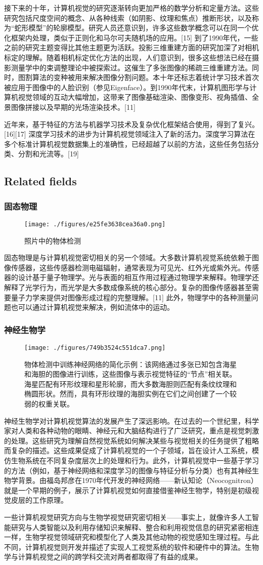 接下来的十年，计算机视觉的研究逐渐转向更加严格的数学分析和定量方法。这些研究包括尺度空间的概念、从各种线索（如阴影、纹理和焦点）推断形状，以及称为“蛇形模型”的轮廓模型。研究人员还意识到，许多这些数学概念可以在同一个优化框架内处理，类似于正则化和马尔可夫随机场的应用。[15] 到了1990年代，一些之前的研究主题变得比其他主题更为活跃。投影三维重建方面的研究加深了对相机标定的理解。随着相机标定优化方法的出现，人们意识到，很多这些想法已经在摄影测量学中的束调整理论中被探索过。这催生了多张图像的稀疏三维重建方法。同时，图割算法的变种被用来解决图像分割问题。本十年还标志着统计学习技术首次被应用于图像中的人脸识别（参见Eigenface）。到1990年代末，计算机图形学与计算机视觉领域的互动大幅增加，这带来了图像基础渲染、图像变形、视角插值、全景图像拼接以及早期的光场渲染技术。[11]

近年来，基于特征的方法与机器学习技术及复杂优化框架结合使用，得到了复兴。[16][17] 深度学习技术的进步为计算机视觉领域注入了新的活力。深度学习算法在多个标准计算机视觉数据集上的准确性，已经超越了以前的方法，这些任务包括分类、分割和光流等。[19]
\subsection{Related fields}
\subsubsection{固态物理}  
\begin{figure}[ht]
\centering
\texttt{[image: ./figures/e25fe3638cea36a0.png]}
\caption{照片中的物体检测} \label{fig_JSJ_1}
\end{figure}
固态物理是与计算机视觉密切相关的另一个领域。大多数计算机视觉系统依赖于图像传感器，这些传感器检测电磁辐射，通常表现为可见光、红外光或紫外光。传感器的设计基于量子物理学。光与表面的相互作用过程通过物理学来解释。物理学还解释了光学行为，而光学是大多数成像系统的核心部分。复杂的图像传感器甚至需要量子力学来提供对图像形成过程的完整理解。[11] 此外，物理学中的各种测量问题也可以通过计算机视觉来解决，例如流体中的运动。
\subsubsection{神经生物学}
\begin{figure}[ht]
\centering
\texttt{[image: ./figures/749b3524c551dca7.png]}
\caption{物体检测中训练神经网络的简化示例：该网络通过多张已知包含海星和海胆的图像进行训练，这些图像与表示视觉特征的“节点”相关联。海星匹配有环形纹理和星形轮廓，而大多数海胆则匹配有条纹纹理和椭圆形状。然而，具有环形纹理的海胆实例在它们之间创建了一个较弱的权重关联。} \label{fig_JSJ_2}
\end{figure}
神经生物学对计算机视觉算法的发展产生了深远影响。在过去的一个世纪里，科学家对人类和各种动物的眼睛、神经元和大脑结构进行了广泛研究，重点是视觉刺激的处理。这些研究为理解自然视觉系统如何解决某些与视觉相关的任务提供了粗略而复杂的描述。这些成果促成了计算机视觉的一个子领域，旨在设计人工系统，模仿生物系统在不同复杂度层次上的处理和行为。此外，计算机视觉中一些基于学习的方法（例如，基于神经网络和深度学习的图像与特征分析与分类）也有其神经生物学背景。由福岛邦彦在1970年代开发的神经网络——新认知论（Neocognitron）就是一个早期的例子，展示了计算机视觉如何直接借鉴神经生物学，特别是初级视觉皮层的工作原理。

一些计算机视觉研究方向与生物学视觉研究密切相关——事实上，就像许多人工智能研究与人类智能以及利用存储知识来解释、整合和利用视觉信息的研究紧密相连一样，生物学视觉领域研究和模型化了人类及其他动物的视觉感知生理过程。与此不同，计算机视觉则开发并描述了实现人工视觉系统的软件和硬件中的算法。生物学与计算机视觉之间的跨学科交流对两者都取得了有益的成果。
